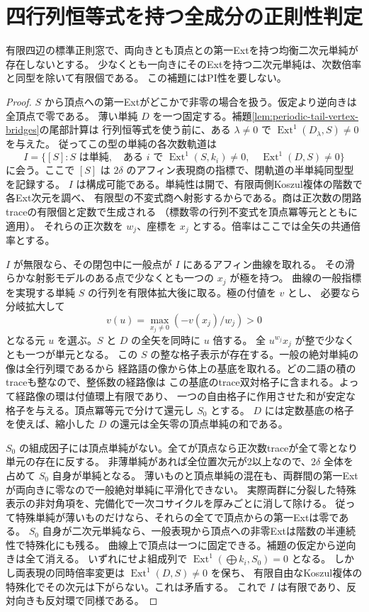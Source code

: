 \section{四行列恒等式を持つ全成分の正則性判定}
\label{sec:four-matrix-all-regular}
\begin{lemma}\label{lem:binary-simple-trace-escape}
有限四辺の標準正則窓で、両向きとも頂点との第一Extを持つ均衡二次元単純が存在しないとする。
少なくとも一向きにそのExtを持つ二次元単純は、次数倍率と同型を除いて有限個である。
この補題にはPI性を要しない。
\end{lemma}
\begin{proof}
$S$ から頂点への第一Extがどこかで非零の場合を扱う。仮定より逆向きは全頂点で零である。
薄い単純 $D$ を一つ固定する。補題\ref{lem:periodic-tail-vertex-bridges}の尾部計算は
行列恒等式を使う前に、ある $\lambda\ne0$ で $\operatorname{Ext}^1(D_\lambda,S)\ne0$ を与えた。
従ってこの型の単純の各次数軌道は
\[
   I=\{[S]: S\text{ は単純},\quad
       \text{ある }i\text{ で }\operatorname{Ext}^1(S,k_i)\ne0,\quad
                       \operatorname{Ext}^1(D,S)\ne0\}
\]
に会う。ここで $[S]$ は $2\delta$ のアフィン表現商の指標で、閉軌道の半単純同型型を記録する。
$I$ は構成可能である。単純性は開で、有限両側Koszul複体の階数で各Ext次元を調べ、
有限型の不変式商へ射影するからである。商は正次数の閉路traceの有限個と定数で生成される
（標数零の行列不変式を頂点冪等元とともに適用）。
それらの正次数を $w_j$、座標を $x_j$ とする。倍率はここでは全矢の共通倍率とする。

$I$ が無限なら、その閉包中に一般点が $I$ にあるアフィン曲線を取れる。
その滑らかな射影モデルのある点で少なくとも一つの $x_j$ が極を持つ。
曲線の一般指標を実現する単純 $S$ の行列を有限体拡大後に取る。極の付値を $v$ とし、
必要なら分岐拡大して
\[
             v(u)=\max_{x_j\ne0}(-v(x_j)/w_j)>0
\]
となる元 $u$ を選ぶ。$S$ と $D$ の全矢を同時に $u$ 倍する。
全 $u^{w_j}x_j$ が整で少なくとも一つが単元となる。
この $S$ の整な格子表示が存在する。一般の絶対単純の像は全行列環であるから
経路語の像から体上の基底を取れる。どの二語の積のtraceも整なので、整係数の経路像は
この基底のtrace双対格子に含まれる。よって経路像の環は付値環上有限であり、
一つの自由格子に作用させた和が安定な格子を与える。頂点冪等元で分けて還元し $S_0$ とする。
$D$ には定数基底の格子を使えば、縮小した $D$ の還元は全矢零の頂点単純の和である。

$S_0$ の組成因子には頂点単純がない。全てが頂点なら正次数traceが全て零となり単元の存在に反する。
非薄単純があれば全位置次元が2以上なので、$2\delta$ 全体を占めて $S_0$ 自身が単純となる。
薄いものと頂点単純の混在も、両群間の第一Extが両向きに零なので一般絶対単純に平滑化できない。
実際両群に分裂した特殊表示の非対角項を、完備化で一次コサイクルを厚みごとに消して除ける。
従って特殊単純が薄いものだけなら、それらの全てで頂点からの第一Extは零である。
$S_0$ 自身が二次元単純なら、一般表現から頂点への非零Extは階数の半連続性で特殊化にも残る。
曲線上で頂点は一つに固定できる。補題の仮定から逆向きは全て消える。
いずれにせよ組成列で $\operatorname{Ext}^1(\bigoplus k_i,S_0)=0$ となる。
しかし両表現の同時倍率変更は $\operatorname{Ext}^1(D,S)\ne0$ を保ち、
有限自由なKoszul複体の特殊化でその次元は下がらない。これは矛盾する。
これで $I$ は有限であり、反対向きも反対環で同様である。
\end{proof}

